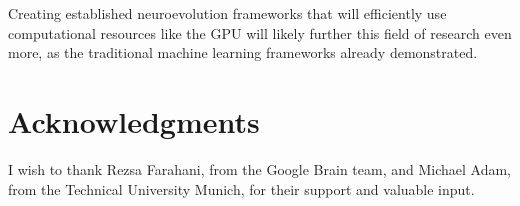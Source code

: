 \documentclass[journal, a4paper]{IEEEtran}
\begin{document}
Creating established neuroevolution frameworks that will efficiently use computational resources like the GPU will likely further this field of research even more, as the traditional machine learning frameworks already demonstrated.




\section{Acknowledgments}

I wish to thank Rezsa Farahani, from the Google Brain team, and Michael Adam, from the Technical University Munich, for their support and valuable input.



\end{document}
